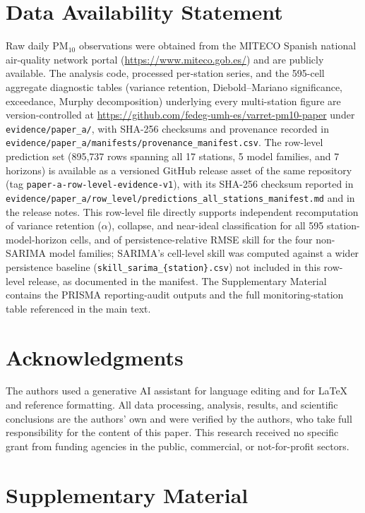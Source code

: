 \documentclass[3p,times,single-column]{elsarticle}
\begin{document}
\section*{Data Availability Statement}
Raw daily PM$_{10}$ observations were obtained from the MITECO Spanish national air-quality network portal (\url{https://www.miteco.gob.es/}) and are publicly available. The analysis code, processed per-station series, and the 595-cell aggregate diagnostic tables (variance retention, Diebold--Mariano significance, exceedance, Murphy decomposition) underlying every multi-station figure are version-controlled at \url{https://github.com/fedeg-umh-es/varret-pm10-paper} under \texttt{evidence/paper\_a/}, with SHA-256 checksums and provenance recorded in \texttt{evidence/paper\_a/manifests/provenance\_manifest.csv}. The row-level prediction set (895{,}737 rows spanning all 17 stations, 5 model families, and 7 horizons) is available as a versioned GitHub release asset of the same repository (tag \texttt{paper-a-row-level-evidence-v1}), with its SHA-256 checksum reported in \texttt{evidence/paper\_a/row\_level/predictions\_all\_stations\_manifest.md} and in the release notes. This row-level file directly supports independent recomputation of variance retention ($\alpha$), collapse, and near-ideal classification for all 595 station-model-horizon cells, and of persistence-relative RMSE skill for the four non-SARIMA model families; SARIMA's cell-level skill was computed against a wider persistence baseline (\texttt{skill\_sarima\_\{station\}.csv}) not included in this row-level release, as documented in the manifest. The Supplementary Material contains the PRISMA reporting-audit outputs and the full monitoring-station table referenced in the main text.

\section*{Acknowledgments}
The authors used a generative AI assistant for language editing and for LaTeX and reference formatting. All data processing, analysis, results, and scientific conclusions are the authors' own and were verified by the authors, who take full responsibility for the content of this paper.
This research received no specific grant from funding agencies in the public, commercial, or not-for-profit sectors.

\section*{Supplementary Material}




\end{document}
